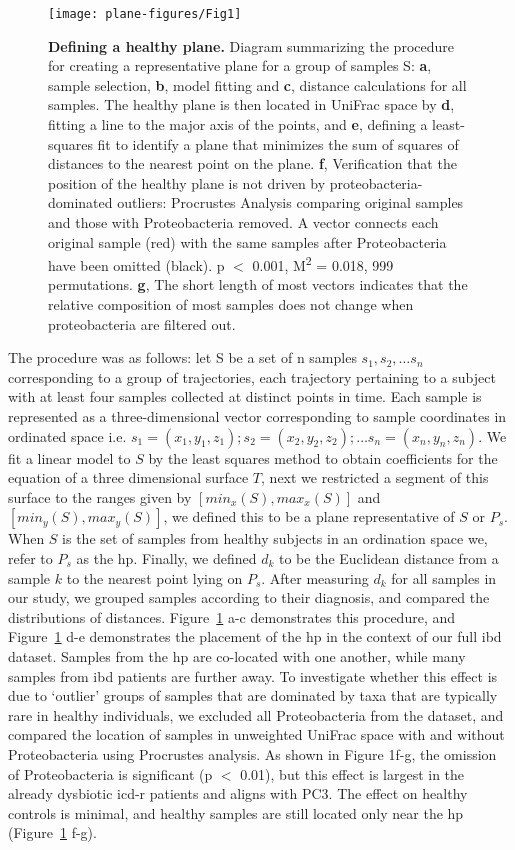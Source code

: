 \begin{figure}[htbp]
\texttt{[image: plane-figures/Fig1]}
\caption[Defining a healthy plane.]{\textbf{Defining a healthy plane.} Diagram summarizing the procedure for creating a representative plane for a group of samples S: \textbf{a}, sample selection, \textbf{b}, model fitting and \textbf{c}, distance calculations for all samples. The healthy plane is then located in UniFrac space by \textbf{d}, fitting a line to the major axis of the points, and \textbf{e}, defining a least-squares fit to identify a plane that minimizes the sum of squares of distances to the nearest point on the plane. \textbf{f}, Verification that the position of the healthy plane is not driven by proteobacteria-dominated outliers: Procrustes Analysis comparing original samples and those with Proteobacteria removed. A vector connects each original sample (red) with the same samples after Proteobacteria have been omitted (black). p $<$ 0.001, M\textsuperscript{2} = 0.018, 999 permutations. \textbf{g}, The short length of most vectors indicates that the relative composition of most samples does not change when proteobacteria are filtered out.}
\label{plane-fig1}
\end{figure} 

The procedure was as follows: let S be a set of n samples $s_1,s_2,… s_n$ corresponding to a group of trajectories, each trajectory pertaining to a subject with at least four samples collected at distinct points in time. Each sample is represented as a three-dimensional vector corresponding to sample coordinates in ordinated space i.e. $s_1=(x_1,y_1,z_1); s_2=(x_2,y_2,z_2); … s_n=(x_n,y_n,z_n)$. We fit a linear model to $S$ by the least squares method to obtain coefficients for the equation of a three dimensional surface $T$, next we restricted a segment of this surface to the ranges given by $[min_x (S),max_x (S)]$ and $[min_y (S),max_y (S)]$, we defined this to be a plane representative of $S$ or $P_s$. When $S$ is the set of samples from healthy subjects in an ordination space we, refer to $P_s$ as the \gls{hp}. Finally, we defined $d_k$ to be the Euclidean distance from a sample $k$ to the nearest point lying on $P_s$. After measuring $d_k$ for all samples in our study, we grouped samples according to their diagnosis, and compared the distributions of distances. Figure~\ref{plane-fig1} a-c demonstrates this procedure, and Figure~\ref{plane-fig1} d-e demonstrates the placement of the \gls{hp} in the context of our full \gls{ibd} dataset. Samples from the \gls{hp} are co-located with one another, while many samples from \gls{ibd} patients are further away. To investigate whether this effect is due to `outlier' groups of samples that are dominated by taxa that are typically rare in healthy individuals, we excluded all Proteobacteria from the dataset, and compared the location of samples in unweighted UniFrac space with and without Proteobacteria using Procrustes analysis. As shown in Figure 1f-g, the omission of Proteobacteria is significant (p $<$ 0.01), but this effect is largest in the already dysbiotic \gls{icd}-r patients and aligns with PC3. The effect on healthy controls is minimal, and healthy samples are still located only near the \gls{hp} (Figure~\ref{plane-fig1} f-g).

